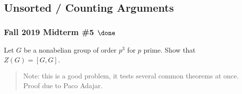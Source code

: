 \hypertarget{unsorted-counting-arguments}{%
\subsection{Unsorted / Counting
Arguments}\label{unsorted-counting-arguments}}

\hypertarget{fall-2019-midterm-5-done}{%
\subsubsection{\texorpdfstring{Fall 2019 Midterm \#5
\(\done\)}{Fall 2019 Midterm \#5 \textbackslash done}}\label{fall-2019-midterm-5-done}}

Let \(G\) be a nonabelian group of order \(p^3\) for \(p\) prime. Show
that \(Z(G) = [G, G]\).

\begin{quote}
Note: this is a good problem, it tests several common theorems at once.
Proof due to Paco Adajar.
\end{quote}

